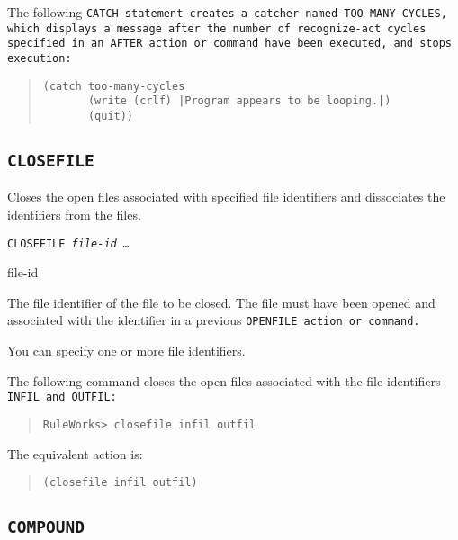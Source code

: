 The following \tt{CATCH} statement creates a catcher named
\tt{TOO-MANY-CYCLES}, which displays a message after the number of
recognize-act cycles specified in an \tt{AFTER} action or command have
been executed, and stops execution:

\begin{quote}
\begin{verbatim}
(catch too-many-cycles
       (write (crlf) |Program appears to be looping.|)
       (quit))
\end{verbatim}
\end{quote}
     
\subsection{\tt{CLOSEFILE}}

Closes the open files associated with specified file identifiers and
dissociates the identifiers from the files.

\Format

\tt{CLOSEFILE} \it{file-id} \ldots

\begin{arguments}
\item[file-id]

  The file identifier of the file to be closed. The file must have
  been opened and associated with the identifier in a previous
  \tt{OPENFILE} action or command.

  You can specify one or more file identifiers.
\end{arguments}

\Example

The following command closes the open files associated with the file
identifiers \tt{INFIL} and \tt{OUTFIL}:

\begin{quote}
\begin{verbatim}
RuleWorks> closefile infil outfil
\end{verbatim}
\end{quote}

The equivalent action is:

\begin{quote}
\begin{verbatim}
(closefile infil outfil)
\end{verbatim}
\end{quote}

\subsection{\tt{COMPOUND}}

